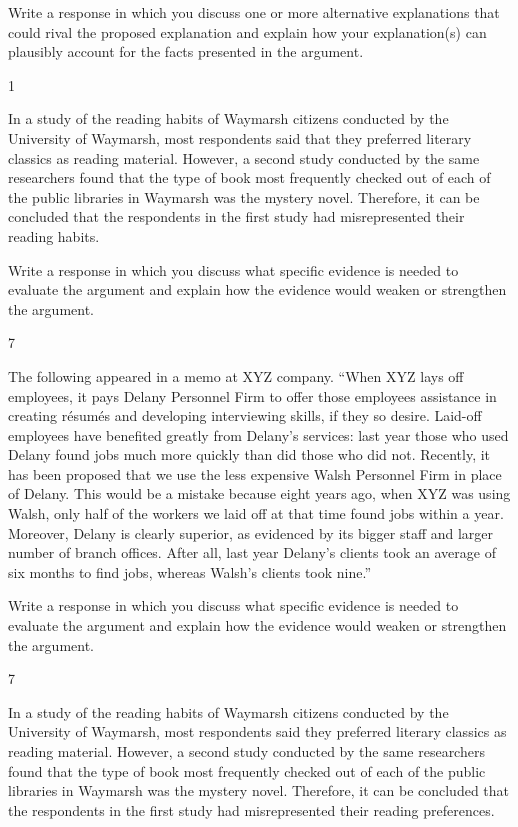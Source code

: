 \documentclass[]{article}
\begin{document}
Write a response in which you discuss one or more alternative
explanations that could rival the proposed explanation and explain how
your explanation(s) can plausibly account for the facts presented in the
argument.

1

In a study of the reading habits of Waymarsh citizens conducted by the
University of Waymarsh, most respondents said that they preferred
literary classics as reading material. However, a second study conducted
by the same researchers found that the type of book most frequently
checked out of each of the public libraries in Waymarsh was the mystery
novel. Therefore, it can be concluded that the respondents in the first
study had misrepresented their reading habits.

Write a response in which you discuss what specific evidence is needed
to evaluate the argument and explain how the evidence would weaken or
strengthen the argument.

7

The following appeared in a memo at XYZ company. ``When XYZ lays off
employees, it pays Delany Personnel Firm to offer those employees
assistance in creating résumés and developing interviewing skills, if
they so desire. Laid-off employees have benefited greatly from Delany's
services: last year those who used Delany found jobs much more quickly
than did those who did not. Recently, it has been proposed that we use
the less expensive Walsh Personnel Firm in place of Delany. This would
be a mistake because eight years ago, when XYZ was using Walsh, only
half of the workers we laid off at that time found jobs within a year.
Moreover, Delany is clearly superior, as evidenced by its bigger staff
and larger number of branch offices. After all, last year Delany's
clients took an average of six months to find jobs, whereas Walsh's
clients took nine.''

Write a response in which you discuss what specific evidence is needed
to evaluate the argument and explain how the evidence would weaken or
strengthen the argument.

7

In a study of the reading habits of Waymarsh citizens conducted by the
University of Waymarsh, most respondents said they preferred literary
classics as reading material. However, a second study conducted by the
same researchers found that the type of book most frequently checked out
of each of the public libraries in Waymarsh was the mystery novel.
Therefore, it can be concluded that the respondents in the first study
had misrepresented their reading preferences.
\end{document}
